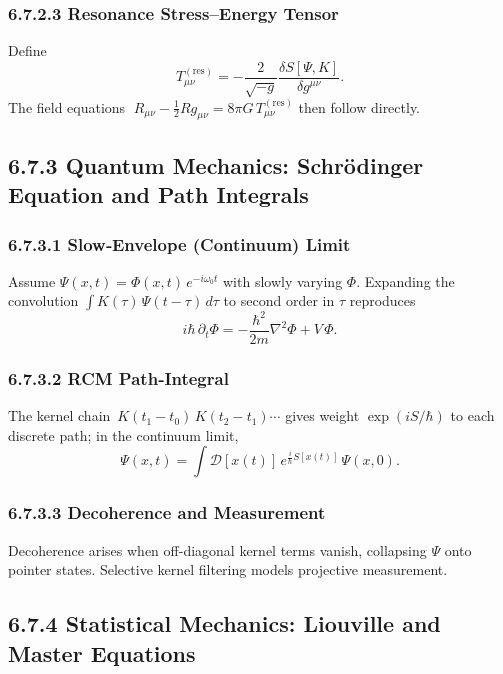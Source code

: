 \subsubsection*{6.7.2.3 Resonance Stress–Energy Tensor}

Define
\[
T_{\mu\nu}^{(\mathrm{res})}
= -\frac{2}{\sqrt{-g}}
  \frac{\delta S[\Psi,K]}{\delta g^{\mu\nu}}.
\]
The field equations
\(\;R_{\mu\nu}-\tfrac12Rg_{\mu\nu}=8\pi G\,T_{\mu\nu}^{(\mathrm{res})}\)
then follow directly.

\medskip

\subsection{6.7.3 Quantum Mechanics: Schrödinger Equation and Path Integrals}

\subsubsection*{6.7.3.1 Slow‐Envelope (Continuum) Limit}

Assume \(\Psi(x,t)=\Phi(x,t)\,e^{-i\omega_0 t}\) with slowly varying \(\Phi\).  Expanding the convolution
\(\int K(\tau)\,\Psi(t-\tau)\,d\tau\)
to second order in \(\tau\) reproduces
\[
i\hbar\,\partial_t\Phi
= -\frac{\hbar^2}{2m}\nabla^2\Phi + V\,\Phi.
\]

\subsubsection*{6.7.3.2 RCM Path‐Integral}

The kernel chain
\(\,K(t_1-t_0)\,K(t_2-t_1)\cdots\)
gives weight \(\exp(iS/\hbar)\) to each discrete path; in the continuum limit,
\[
\Psi(x,t)
=\int\!\mathcal{D}[x(t)]\,e^{\tfrac{i}{\hbar}S[x(t)]}\,\Psi(x,0).
\]

\subsubsection*{6.7.3.3 Decoherence and Measurement}

Decoherence arises when off-diagonal kernel terms vanish, collapsing \(\Psi\) onto pointer states.  Selective kernel filtering models projective measurement.

\medskip

\subsection{6.7.4 Statistical Mechanics: Liouville and Master Equations}

